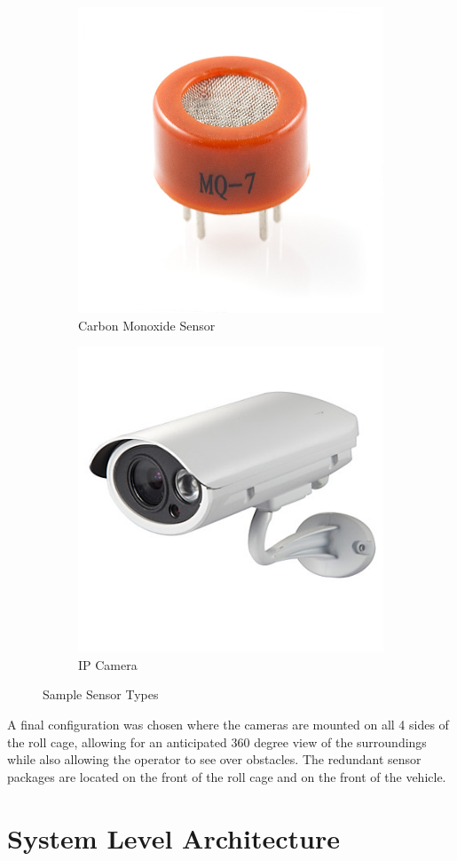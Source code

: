 \begin{figure}[H]
\centering
\begin{subfigure}{.5\textwidth}
  \centering
  \includegraphics[height=.5\linewidth]{cosensor}
  \caption{Carbon Monoxide Sensor}
  \label{fig:sub1}
\end{subfigure}%
\begin{subfigure}{.5\textwidth}
  \centering
  \includegraphics[height=.5\linewidth]{camera}
  \caption{IP Camera}
  \label{fig:sub2}
\end{subfigure}
\caption{Sample Sensor Types}
\label{fig:sensortest}
\end{figure}

A final configuration was chosen where the cameras are mounted on all 4 sides of the roll cage, allowing for an anticipated 360 degree view of the surroundings while also allowing the operator to see over obstacles. The redundant sensor packages are  located on the front of the roll cage and on the front of the vehicle. 

 
%
\section{System Level Architecture}

